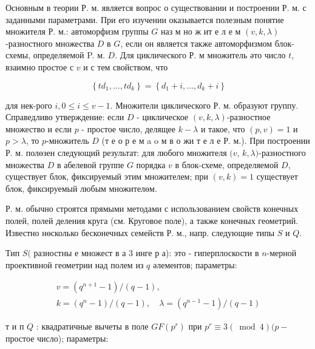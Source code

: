 \documentclass[10pt]{article}
\begin{document}
Основным в теории Р. м. является вопрос о существовании и построении Р. м. с заданными параметрами. При его изучении оказывается полезным понятие множителя Р. м.: автоморфизм группы $G$ наз м но ж ит е л е м $(v, k, \lambda)$-разностного множества $D$ в $G$, если он является также автоморфизмом блок-схемы, определяемой P. м. $D$. Для циклического Р. м множитель әто число $t$, взаимно простое с $v$ и с тем свойством, что



\[

\left\{t d_{1}, \ldots, t d_{k}\right\}=\left\{d_{1}+i, \ldots, d_{k}+i\right\}

\]



для нек-рого $i, 0 \leqslant i \leqslant v-1$. Множители циклического Р. м. образуют группу. Справедливо утверждение: если $D$ - циклическое $(v, k, \lambda)$-разностное множество и если $p$ - простое число, делящее $k-\lambda$ и такое, что $(p, v)=1$ и $p>\lambda$, то $p$-множитель $D$ (т е о р е м a o м в о жи т е л е Р. м.). При построении Р. м. полөзен следующий результат: для любого множителя $(v$, $k, \lambda)$-разностного множества $D$ в абелевой группе $G$ порядка $v$ в блок-схеме, определяемой $D$, существует блок, фиксируемый этим множителем; при $(v, k)=1$ существует блок, фиксируемый любым множителөм.



Р. м. обычно строятся прямыми методами с использованием свойств конечных полей, полей деления круга (см. Круговое поле), а также конечных геометрий. Известно нөсколько бесконечных семейств Р. м., напр. следующие типы $S$ и $Q$.



Тип $S($ разностны е множест в а 3 инге р а): это - гиперплоскости в $n$-мерной проективной геометрии над полем из $q$ әлементов; параметры:



\[

\begin{gathered}

v=\left(q^{n+1}-1\right) /(q-1), \\

k=\left(q^{n}-1\right) /(q-1), \quad \lambda=\left(q^{n-1}-1\right) /(q-1)

\end{gathered}

\]



т и п $Q$ : квадратичные вычеты в поле $G F\left(p^{r}\right)$ при $p^{r} \equiv 3(\bmod 4)(p-$ простое число); параметры:
\end{document}
